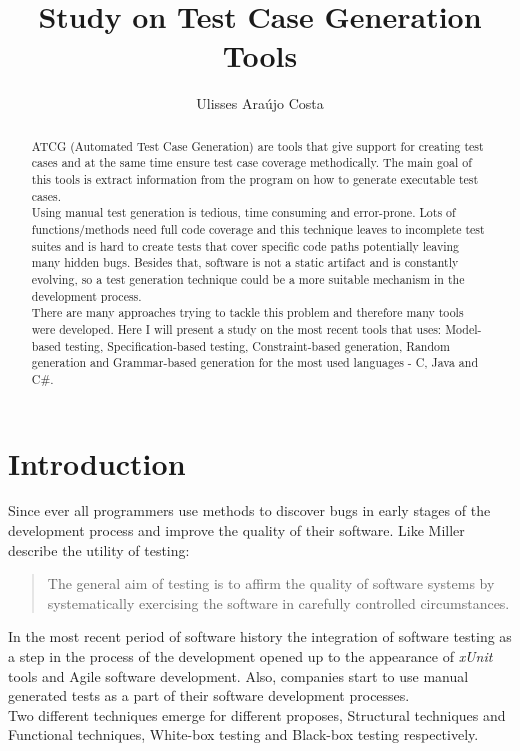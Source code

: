\documentclass[citeauthoryear]{llncs}
\title{Study on Test Case Generation Tools}
\author{Ulisses Araújo Costa}
\institute{Department of Informatics, University of Minho\\ Campus de Gualtar, 4710-057 Braga, Portugal\\
\email{ulissesmonhecosta@gmail.com}
}
\newcommand{\xunit}{\textit{xUnit}}
\begin{document}
\maketitle
\begin{abstract}
ATCG (Automated Test Case Generation) are tools that give support for creating test cases and at the same time ensure test case coverage methodically.
The main goal of this tools is extract information from the program on how to generate executable test cases.\\
Using  manual test generation is tedious, time consuming and error-prone. Lots of functions/methods need full code coverage and this technique leaves
to incomplete test suites and is hard to create tests that cover specific code paths potentially leaving many hidden bugs.
Besides that, software is not a static artifact and is constantly evolving, so a test generation technique could be a more suitable mechanism in the development process.\\
There are many approaches trying to tackle this problem and therefore many tools were developed. Here I will present a study on the most recent tools that uses:
Model-based testing, Specification-based testing, Constraint-based generation, Random generation and Grammar-based generation for the most used languages - C, Java and C\#.
\end{abstract}

\section{Introduction}
Since ever all programmers use methods to discover bugs in early stages of the development process and improve the quality of their software.
Like Miller describe the utility of testing\cite{miller}:

\begin{quotation}
The general aim of testing is to affirm the quality of software systems by systematically exercising the software in carefully controlled circumstances.
\end{quotation}

In the most recent period of software history the integration of software testing as a step in the process of the development opened up to the
appearance of \xunit\cite{xunit} tools and Agile software development. Also, companies start to use manual generated tests as a part of their software development processes.\\
Two different techniques emerge for different proposes, Structural techniques and Functional techniques, White-box testing and Black-box\cite{black} testing respectively.
\end{document}
